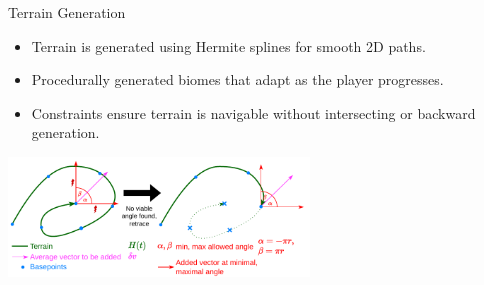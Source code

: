 \begin{frame}{Terrain Generation}
    \begin{itemize}
        \item Terrain is generated using Hermite splines for smooth 2D paths.
        \item Procedurally generated biomes that adapt as the player progresses.
        \item Constraints ensure terrain is navigable without intersecting or backward generation.
    \end{itemize}
    \centering
    \includegraphics[width=0.6\textwidth]{../figures/Retrace.pdf} %
\end{frame}